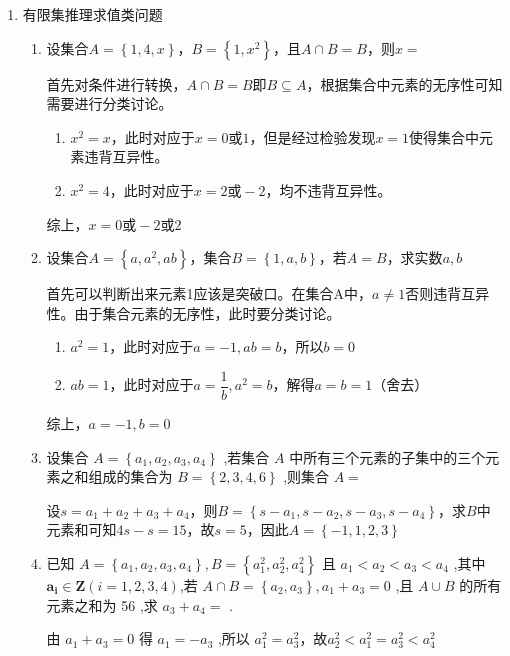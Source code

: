\begin{enumerate}
    \item 有限集推理求值类问题
    \begin{enumerate}
        \item 设集合$A = \left\{1, 4, x\right\}$，$B = \left\{1, x^2\right\}$，且$A \cap B = B$，则$x = $
        \begin{jieda}
            首先对条件进行转换，$A \cap B = B$即$B \subseteq A$，根据集合中元素的无序性可知需要进行分类讨论。
            \begin{enumerate}
                \item $x^2 = x$，此时对应于$x = 0 \mbox{或} 1$，但是经过检验发现$x = 1$使得集合中元素违背互异性。
                \item $x^2 = 4$，此时对应于$x = 2 \mbox{或} -2$，均不违背互异性。
            \end{enumerate}
            综上，$x = 0 \mbox{或} -2 \mbox{或} 2$
        \end{jieda}
        \item 设集合$A = \left\{a, a^2, ab\right\}$，集合$B = \left\{1, a, b\right\}$，若$A = B$，求实数$a,b$
        \begin{jieda}
            首先可以判断出来元素1应该是突破口。在集合A中，$a \neq 1$否则违背互异性。由于集合元素的无序性，此时要分类讨论。
            \begin{enumerate}
                \item $a^2 = 1$，此时对应于$a = -1, ab = b$，所以$b = 0$
                \item $ab = 1$，此时对应于$a = \dfrac{1}{b}, a^2 = b$，解得$a = b = 1$（舍去）
            \end{enumerate}
            综上，$a = -1, b = 0$
        \end{jieda}
        \item 设集合 $A = \left\{  {{a}_{1},{a}_{2},{a}_{3},{a}_{4}}\right\}$ ,若集合 ${A}$ 中所有三个元素的子集中的三个元素之和组成的集合为 $B = \left\{ 2,3,4,6\right\}$ ,则集合 $A =$ 
        \begin{jieda}
            设$s = a_1 + a_2 + a_3 + a_4$，则$B = \left\{s-a_1, s-a_2, s-a_3, s-a_4\right\}$，求$B$中元素和可知$4s-s = 15$，故$s = 5$，因此$A = \left\{-1,1,2,3\right\}$
        \end{jieda}
        \item 已知 $A = \left\{  {{a}_{1},{a}_{2},{a}_{3},{a}_{4}}\right\}  ,B = \left\{  {{a}_{1}^{2},{a}_{2}^{2},{a}_{4}^{2}}\right\}$ 且 ${a}_{1} < {a}_{2} < {a}_{3} < {a}_{4}$ ,其中 ${\mathbf{a}}_{\mathbf{i}} \in  \mathbf{Z}(i = 1,2,3,4)$,若 $A \cap  B = \left\{  {{a}_{2},{a}_{3}}\right\}  ,{a}_{1} + {a}_{3} = 0$ ,且 $A \cup  B$ 的所有元素之和为 56 ,求 ${a}_{3} + {a}_{4} =$ .
        \begin{jieda}
            由 ${a}_{1} + {a}_{3} = 0$ 得 ${a}_{1} =  - {a}_{3}$ ,所以 ${a}_{1}^{2} = {a}_{3}^{2}$，故$a_2^2 < a_1^2 = a_3^2 < a_4^2$
    

\end{jieda}
\end{enumerate}
\end{enumerate}
